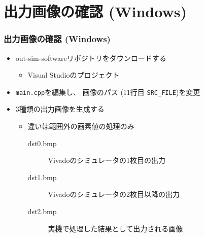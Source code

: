 ﻿\documentclass[dvipdfmx]{beamer}
\begin{document}
\section{出力画像の確認 (Windows)}
\begin{frame}[fragile]
	\frametitle{出力画像の確認 (Windows)}
	\begin{itemize}
		\item
			out-sim-softwareリポジトリをダウンロードする
			\begin{itemize}
				\item
					Visual Studioのプロジェクト
			\end{itemize}
			\vfill
		\item
			\verb|main.cpp|を編集し、
			画像のパス (11行目 \verb|SRC_FILE|)を変更
			\vfill
		\item
			3種類の出力画像を生成する
			\begin{itemize}
				\item
					違いは範囲外の画素値の処理のみ
					\begin{description}
						\item[dst0.bmp]\mbox{}
							Vivadoのシミュレータの1枚目の出力
						\item[dst1.bmp]\mbox{}
							Vivadoのシミュレータの2枚目以降の出力
						\item[dst2.bmp]\mbox{}
							実機で処理した結果として出力される画像
					\end{description}
			\end{itemize}
	\end{itemize}
\end{frame}
\end{document}
